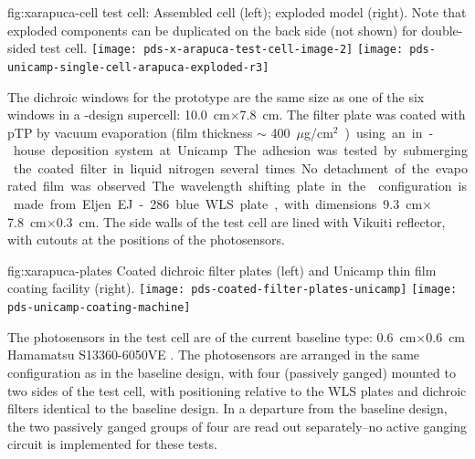 \begin{dunefigure}{fig:xarapuca-cell}
{ test cell:  Assembled cell (left); exploded model (right).  Note that exploded components can be duplicated on the back side (not shown) for double-sided test cell.} 
	\texttt{[image: pds-x-arapuca-test-cell-image-2]}
	    \texttt{[image: pds-unicamp-single-cell-arapuca-exploded-r3]}
\end{dunefigure}


The dichroic windows for the prototype are the same size as one of the six windows in a -design  supercell: \SI{10.0}{cm}$\times$\SI{7.8}{cm}. The filter plate was coated with pTP by vacuum evaporation (film thickness $\sim$ \SI{400}{${\mu}$g/cm$^2$})  using an in-house deposition system at Unicamp. The adhesion was tested by submerging the coated filter in liquid nitrogen several times. No detachment of the evaporated film was observed.
The wavelength shifting plate in the  configuration is made from Eljen EJ-286 blue WLS plate, with dimensions \SI{9.3}{cm}$\times$\SI{7.8}{cm}$\times$\SI{0.3}{cm}.  The side walls of the test cell are lined with Vikuiti reflector, with cutouts at the positions of the photosensors.

\begin{dunefigure}{fig:xarapuca-plates}
{Coated dichroic filter plates (left) and Unicamp thin film coating facility (right).} 
	\texttt{[image: pds-coated-filter-plates-unicamp]}\quad
	\texttt{[image: pds-unicamp-coating-machine]}
\end{dunefigure}

The photosensors in the test cell are of the current baseline type:  \SI{0.6}{cm}$\times$\SI{0.6}{cm} Hamamatsu S13360-6050VE .  The photosensors are arranged in the same configuration as in the baseline design, with four  (passively ganged) mounted to two sides of the test cell, with positioning relative to the WLS plates and dichroic filters identical to the baseline design.  In a departure from the baseline design, the two passively ganged groups of four  are read out separately--no active ganging circuit is implemented for these tests. 

